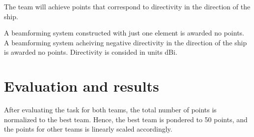 \documentclass{article}[a4paper]
\begin{document}
The team will achieve points that correspond to directivity in the direction of the ship.

A beamforming system constructed with just one element is awarded no points. A beamforming system acheiving negative directivity in the direction of the ship is awarded no points. Directivity is consided in units dBi.

\section{Evaluation and results}

After evaluating the task for both teams, the total number of points is normalized to the best team. Hence, the best team is pondered to 50 points, and the points for other teams is linearly scaled accordingly.
\end{document}
